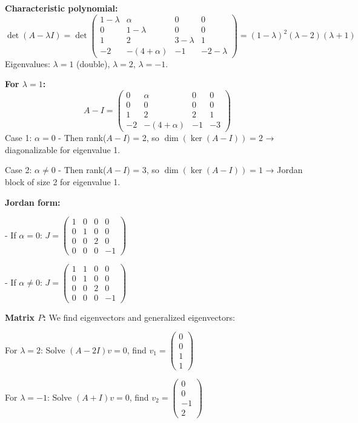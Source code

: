 \documentclass[12pt]{article}
\begin{document}
\begin{correctionbox}
\textbf{Characteristic polynomial:}
\[
\det(A-\lambda I) = \det\begin{pmatrix}
1-\lambda & \alpha & 0 & 0 \\
0 & 1-\lambda & 0 & 0 \\
1 & 2 & 3-\lambda & 1 \\
-2 & -(4+\alpha) & -1 & -2-\lambda
\end{pmatrix} = (1-\lambda)^2(\lambda-2)(\lambda+1)
\]
Eigenvalues: $\lambda = 1$ (double), $\lambda = 2$, $\lambda = -1$.

\textbf{For $\lambda = 1$:}
\[
A - I = \begin{pmatrix} 0 & \alpha & 0 & 0 \\ 0 & 0 & 0 & 0 \\ 1 & 2 & 2 & 1 \\ -2 & -(4+\alpha) & -1 & -3 \end{pmatrix}
\]
Case 1: $\alpha = 0$
- Then rank($A-I$) = 2, so $\dim(\ker(A-I)) = 2$ → diagonalizable for eigenvalue 1.

Case 2: $\alpha \neq 0$
- Then rank($A-I$) = 3, so $\dim(\ker(A-I)) = 1$ → Jordan block of size 2 for eigenvalue 1.

\textbf{Jordan form:}

- If $\alpha = 0$: $J = \begin{pmatrix} 1 & 0 & 0 & 0 \\ 0 & 1 & 0 & 0 \\ 0 & 0 & 2 & 0 \\ 0 & 0 & 0 & -1 \end{pmatrix}$

- If $\alpha \neq 0$: $J = \begin{pmatrix} 1 & 1 & 0 & 0 \\ 0 & 1 & 0 & 0 \\ 0 & 0 & 2 & 0 \\ 0 & 0 & 0 & -1 \end{pmatrix}$

\textbf{Matrix $P$:}
We find eigenvectors and generalized eigenvectors:

For $\lambda = 2$: Solve $(A-2I)v=0$, find $v_1 = \begin{pmatrix} 0 \\ 0 \\ 1 \\ 1 \end{pmatrix}$

For $\lambda = -1$: Solve $(A+I)v=0$, find $v_2 = \begin{pmatrix} 0 \\ 0 \\ -1 \\ 2 \end{pmatrix}$


\end{correctionbox}
\end{document}

